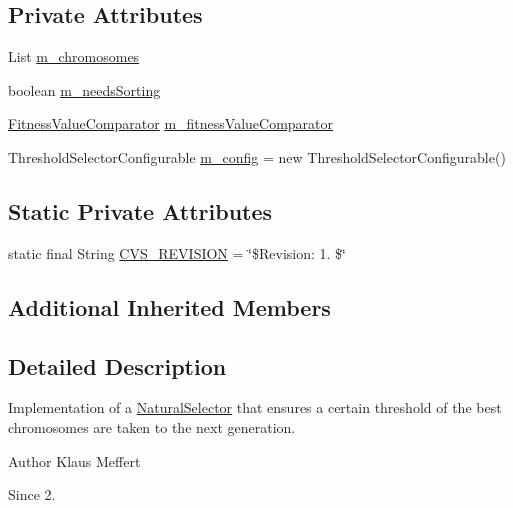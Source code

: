 \subsection*{Private Attributes}
\begin{DoxyCompactItemize}
\item 
List \hyperlink{classorg_1_1jgap_1_1impl_1_1_threshold_selector_a905254461fabd1a828e42c639bd5cbfb}{m\-\_\-chromosomes}
\item 
boolean \hyperlink{classorg_1_1jgap_1_1impl_1_1_threshold_selector_a8c0fdf7f12fa4492098068f1678a4e13}{m\-\_\-needs\-Sorting}
\item 
\hyperlink{classorg_1_1jgap_1_1impl_1_1_threshold_selector_1_1_fitness_value_comparator}{Fitness\-Value\-Comparator} \hyperlink{classorg_1_1jgap_1_1impl_1_1_threshold_selector_a33a3ccca9c1908e0b42a873eaa89544b}{m\-\_\-fitness\-Value\-Comparator}
\item 
Threshold\-Selector\-Configurable \hyperlink{classorg_1_1jgap_1_1impl_1_1_threshold_selector_a389543dd89814de9ac7aae9225f0128f}{m\-\_\-config} = new Threshold\-Selector\-Configurable()
\end{DoxyCompactItemize}
\subsection*{Static Private Attributes}
\begin{DoxyCompactItemize}
\item 
static final String \hyperlink{classorg_1_1jgap_1_1impl_1_1_threshold_selector_a2eb4c7aad8839a9485f499ee9605f078}{C\-V\-S\-\_\-\-R\-E\-V\-I\-S\-I\-O\-N} = \char`\"{}\$Revision\-: 1. \$\char`\"{}
\end{DoxyCompactItemize}
\subsection*{Additional Inherited Members}


\subsection{Detailed Description}
Implementation of a \hyperlink{classorg_1_1jgap_1_1_natural_selector}{Natural\-Selector} that ensures a certain threshold of the best chromosomes are taken to the next generation.

\begin{DoxyAuthor}{Author}
Klaus Meffert 
\end{DoxyAuthor}
\begin{DoxySince}{Since}
2. 
\end{DoxySince}


